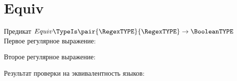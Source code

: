 \section{Equiv}
\begin{frame}{Предикат $Equiv\TypeIs\pair{\RegexTYPE}{\RegexTYPE}\to\BooleanTYPE$}
	Первое регулярное выражение:

	Второе регулярное выражение:

	Результат проверки на эквивалентность языков:



\end{frame}

